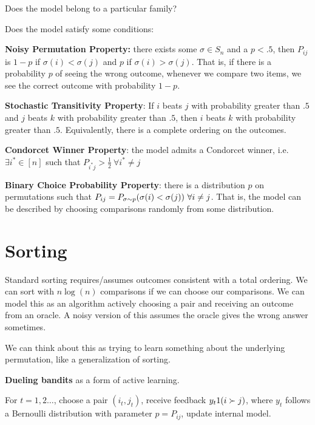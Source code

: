 \documentclass[twoside]{article}
\begin{document}
Does the model belong to a particular family?

Does the model satisfy some conditions:

\textbf{Noisy Permutation Property:} there exists some $\sigma\in S_n$ and a $p<.5$, then $P_{ij}$ is $1-p$ if $\sigma(i) < \sigma(j)$ and $p$ if $\sigma(i) > \sigma(j)$.  That is, if there is a probability $p$ of seeing the wrong outcome, whenever we compare two items, we see the correct outcome with probability $1-p$.

\textbf{Stochastic Transitivity Property}: If $i$ beats $j$ with probability greater than $.5$ and $j$ beats $k$ with probability greater than $.5$, then $i$ beats $k$ with probability greater than $.5$.  Equivalently, there is a complete ordering on the outcomes.

\textbf{Condorcet Winner Property}: the model admits a Condorcet winner, i.e. $\exists i^* \in [n]$ such that $P_{i^*j} > \frac{1}{2} \  \forall i^* \neq j$ 

\textbf{Binary Choice Probability Property}: there is a distribution $p$ on permutations such that $P_{ij} = \boldmath{P}_{\sigma \sim p} (\sigma(i) < \sigma(j)) \ \forall i\neq j$.  That is, the model can be described by choosing comparisons randomly from some distribution.


\section*{Sorting}

Standard sorting requires/assumes outcomes consistent with a total ordering.  We can sort with $n\log(n)$ comparisons if we can choose our comparisons.  We can model this as an algorithm actively choosing a pair and receiving an outcome from an oracle.  A noisy version of this assumes the oracle gives the wrong answer sometimes.

We can think about this as trying to learn something about the underlying permutation, like a generalization of sorting.

\textbf{Dueling bandits} as a form of active learning.  

For $t=1,2\dots$, choose a pair $(i_t,j_t)$, receive feedback $y_t\boldmath{1}(i\succ j)$, where $y_t$ follows a Bernoulli distribution with parameter $p=P_{ij}$, update internal model.
\end{document}
